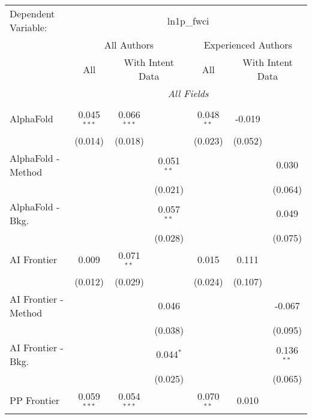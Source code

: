 \begingroup
\centering
\begin{tabular}{lcccccc}
   \tabularnewline \midrule \midrule
   Dependent Variable: & \multicolumn{6}{c}{ln1p\_fwci}\\
 & \multicolumn{3}{c}{All Authors} & \multicolumn{3}{c}{Experienced Authors} \\
\cmidrule(lr){2-4} \cmidrule(lr){5-7}
 & \multicolumn{1}{c}{All} & \multicolumn{2}{c}{With Intent Data} & \multicolumn{1}{c}{All} & \multicolumn{2}{c}{With Intent Data} \\
\cmidrule(lr){2-2} \cmidrule(lr){3-4} \cmidrule(lr){5-5} \cmidrule(lr){6-7}
 & \multicolumn{6}{c}{\textit{All Fields}} \\ \\
   AlphaFold            & 0.045$^{***}$ & 0.066$^{***}$ &               & 0.048$^{**}$ & -0.019  &   \\   
                        & (0.014)       & (0.018)       &               & (0.023)      & (0.052) &   \\   
   AlphaFold - Method   &               &               & 0.051$^{**}$  &              &         & 0.030\\   
                        &               &               & (0.021)       &              &         & (0.064)\\   
   AlphaFold - Bkg.     &               &               & 0.057$^{**}$  &              &         & 0.049\\   
                        &               &               & (0.028)       &              &         & (0.075)\\   
   AI Frontier          & 0.009         & 0.071$^{**}$  &               & 0.015        & 0.111   &   \\   
                        & (0.012)       & (0.029)       &               & (0.024)      & (0.107) &   \\   
   AI Frontier - Method &               &               & 0.046         &              &         & -0.067\\   
                        &               &               & (0.038)       &              &         & (0.095)\\   
   AI Frontier - Bkg.   &               &               & 0.044$^{*}$   &              &         & 0.136$^{**}$\\   
                        &               &               & (0.025)       &              &         & (0.065)\\   
   PP Frontier          & 0.059$^{***}$ & 0.054$^{***}$ &               & 0.070$^{**}$ & 0.010   &   \\   

\end{tabular}
